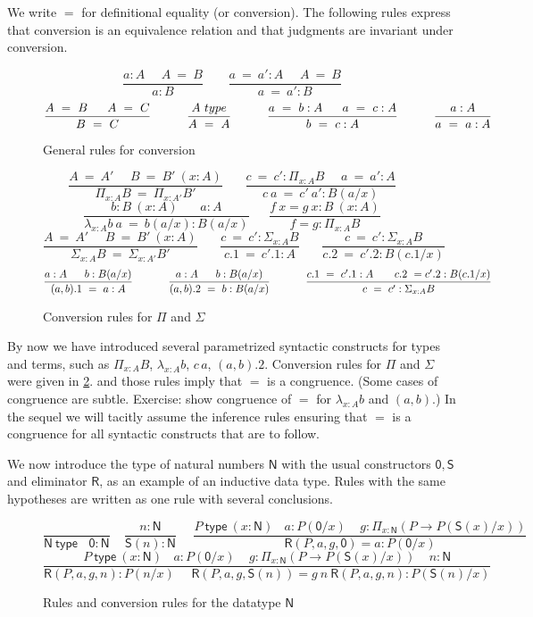\documentclass[a4paper,UKenglish,cleveref, autoref, thm-restate]{lipics-v2021}
\newcommand{\conv}{=}
\newcommand{\NN}{\mathsf{N}}
\newcommand{\ZERO}{\mathsf{0}}
\newcommand{\SUCC}{\mathsf{S}}
\newcommand{\type}{\mathsf{type}}
\newcommand{\mylam}[3]{\lambda_{#1:#2}#3}
\newcommand{\mypi}[3]{\Pi_{#1:#2}#3}
\newcommand{\mysig}[3]{\Sigma_{#1:#2}#3}
\newcommand{\app}[2]{{#1\,#2}} %
\newcommand{\Sapp}[1]{\sapp{\SUCC}{#1}}
\newcommand{\sapp}[2]{{#1(#2)}} %
\newcommand{\NRapp}[4]{\sapp{\RR}{#1,#2,#3,#4}}
\newcommand{\RR}{\mathsf{R}}
\begin{document}
We write $\conv$ for definitional equality (or conversion).
The following rules express that conversion is an equivalence
relation and that judgments are invariant under conversion.

\begin{figure}[h]
  \caption{General rules for conversion}\label{fig:conversion}
$$
\frac{ a:A~~~~~~ A~ \conv~ B}{ a:B}~~~~~~~~~
\frac{ a ~\conv~a':A~~~~~~ A  ~\conv~ B}{ a ~\conv~a':B}
$$
$$
\frac{A~=~B~~~~~A~=~C}{B~=~C}~~~~~~~~~\frac{A~\type}{A~=~A}~~~~~~~~~
\frac{a~=~b:A~~~~~a~=~c:A}{b~=~c:A}~~~~~~~~~\frac{a:A}{a~=~a:A}
\belowdisplayshortskip 1pt
$$
\end{figure}

\begin{figure}[H]
  \caption{Conversion rules for $\Pi$ and $\Sigma$}\label{fig:convPiSig}
$$
\frac{A~=~A'~~~~~~B~=~B'~(x:A)}{\mypi{x}{A}{B}~=~\mypi{x}{A'}{B'}}~~~~~~~~
\frac{c~=~c':\mypi{x}{A}{B}~~~~~~a~=~a':A}{c~a~=~c'~a':B(a/x)}
$$
$$
\frac{b:B~(x:A)~~~~~~~~ a:A}{ \mylam{x}{A}{b}~a  ~\conv~ b(a/x):B(a/x)}
~~~~~~~
\frac{f~x = g~x:B~(x:A)}{ f = g : \mypi{x}{A}{B}}
$$
$$
\frac{A~=~A'~~~~~~B~=~B'~(x:A)}{\mysig{x}{A}{B}~=~\mysig{x}{A'}{B'}}~~~~~~~~
\frac{c~=~c':\mysig{x}{A}{B}}{c.1~=~c'.1:A}~~~~~~~~
\frac{c~=~c':\mysig{x}{A}{B}}{c.2~=~c'.2:B(c.1/x)}~~~~~~~~
$$
$$
\frac{a:A~~~~~b:B(a/x)}{ (a,b).1 ~\conv~ a:A}~~~~~~~~~~
\frac{a:A~~~~~b:B(a/x)}{ (a,b).2 ~\conv~ b:B(a/x)}~~~~~~~~~~
\frac{c.1~=~ c'.1:A~~~~~~c.2~=c'.2:B(c.1/x)}{ c~=~ c' : \mysig{x}{A}{B}}
\belowdisplayshortskip 0pt
$$
\end{figure}

By now we have introduced several parametrized syntactic constructs
for types and terms, such as $\mypi{x}{A}{B}$,
$\mylam{x}{A}{b}$, $\app{c}{a}$, $(a,b).2$.
Conversion rules for $\Pi$ and $\Sigma$ were given in \cref{fig:convPiSig}.
and those rules imply that $=$ is a congruence.%
(Some cases of congruence are subtle. Exercise:
show congruence of $=$ for $\mylam{x}{A}{b}$ and $(a,b)$.)
In the sequel we will tacitly assume the inference rules
ensuring that $=$ is a congruence for all syntactic constructs
that are to follow.

We now introduce the type of natural numbers $\NN$ with
the usual constructors $\ZERO,\SUCC$ and eliminator $\RR$,
as an example of an inductive data type.
Rules with the same hypotheses are written as one rule with
several conclusions.

\begin{figure}[H]
  \caption{Rules and conversion rules for the datatype $\NN$}\label{fig:typeN}
$$
\frac{}{\NN~\type~~~~\ZERO:\NN}~~~~~
\frac{n:\NN}{\Sapp{n} : \NN}~~~~~~
\frac{P~\type~(x:\NN)~~~~a:P(\ZERO/x)~~~~~
g:\mypi{x}{\NN}{(P\to P(\Sapp{x}/x))}}
{\NRapp{P}{a}{g}{\ZERO} = a: P(\ZERO/x) }
$$
$$
\frac{P~\type~(x:\NN)~~~~a:P(\ZERO/x)~~~~~
g:\mypi{x}{\NN}{(P\to P(\Sapp{x}/x))}~~~~~n:\NN}
{\NRapp{P}{a}{g}{n}:P(n/x)~~~~~~\NRapp{P}{a}{g}{\Sapp{n}} = g~n~\NRapp{P}{a}{g}{n}: P(\Sapp{n}/x) }
$$
\end{figure}
\end{document}
